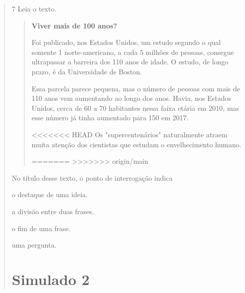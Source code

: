\begin{quote}
\num{7} Leia o texto.

\begin{quote}
\textbf{Viver mais de 100 anos?}

Foi publicado, nos Estados Unidos, um estudo segundo o qual somente 1 norte-americano,
a cada 5 milhões de pessoas, consegue ultrapassar a barreira dos 110 anos de idade.
O estudo, de longo prazo, é da Universidade de Boston.

Essa parcela parece pequena, mas o número de pessoas com mais de 110 anos vem aumentando
ao longo dos anos. Havia, nos Estados Unidos, cerca de 60 a 70 habitantes nessa faixa
etária em 2010, mas esse número já tinha aumentado para 150 em 2017.

<<<<<<< HEAD
Os "supercentenários" naturalmente atraem muita atenção dos cientistas
que estudam o envelhecimento humano.

=======
>>>>>>> origin/main
\end{quote}

No título desse texto, o ponto de interrogação indica

\begin{escolha}
\item o destaque de uma ideia.

\item a divisão entre duas frases.

\item o fim de uma frase.

\item uma pergunta.
\end{escolha}


\chapter{Simulado 2}


\end{quote}
